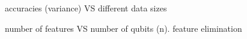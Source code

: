 \documentclass[
reprint,
aps,
pra,
floatfix,
]{revtex4-2}
\theoremstyle{plain}
\theoremstyle{definition}
\begin{document}
\begin{figure}[!ht]
	\centering
	\caption{accuracies (variance) VS different data sizes}
\end{figure}
\begin{figure}[!ht]
	\centering
	\caption{number of features VS number of qubits (n). feature elimination}
\end{figure}

\end{document}
